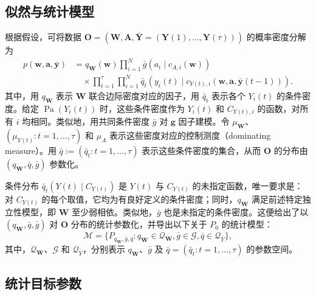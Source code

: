 \subsection{似然与统计模型}

根据假设，可将数据 $\mathbf O=(\mathbf W,\mathbf A,\bar{\mathbf Y}=(\mathbf Y(1),\ldots,\mathbf Y(\tau)))$ 的概率密度分解为
\begin{equation}
\begin{aligned}
 p(\mathbf w,\mathbf a,\bar{\mathbf y})
 &=q_{\mathbf W}(\mathbf w)\prod_{i=1}^N\bar g(a_i\mid c_{A,i}(\mathbf w))\\
 &\quad{}\times\prod_{t=1}^\tau\prod_{i=1}^N
 \bar q_t(y_i(t)\mid c_{Y(t),i}(\mathbf w,\mathbf a,\bar{\mathbf y}(t-1))).
\end{aligned}
\tag{20.7}
\end{equation}
其中，用 $q_{\mathbf W}$ 表示 $\mathbf W$ 联合边际密度对应的因子，用 $\bar q_t$ 表示各个 $Y_i(t)$ 的条件密度。给定 $\operatorname{Pa}(Y_i(t))$ 时，这些条件密度作为 $Y_i(t)$ 和 $C_{Y(t),i}$ 的函数，对所有 $i$ 均相同。类似地，用共同条件密度 $\bar g$ 对 $\mathbf g$ 因子建模。令 $\mu_{\mathbf W}$、$(\mu_{Y(t)}:t=1,\ldots,\tau)$ 和 $\mu_A$ 表示这些密度对应的控制测度（dominating measure）。用 $\bar q:=(\bar q_t:t=1,\ldots,\tau)$ 表示这些条件密度的集合，从而 $\mathbf O$ 的分布由 $(q_{\mathbf W},\bar q,\bar g)$ 参数化。

条件分布 $\bar q_t(Y(t)\mid C_{Y(t)})$ 是 $Y(t)$ 与 $C_{Y(t)}$ 的未指定函数，唯一要求是：对 $C_{Y(t)}$ 的每个取值，它均为有良好定义的条件密度；同时，$q_{\mathbf W}$ 满足前述特定独立性模型，即 $\mathbf W$ 至少弱相依。类似地，$\bar g$ 也是未指定的条件密度。这便给出了以 $(q_{\mathbf W},\bar q,\bar g)$ 对 $\mathbf O$ 分布的统计参数化，并导出以下关于 $P_0$ 的统计模型：
\begin{equation}
 \mathcal M=\{P_{q_{\mathbf W},\bar g,\bar q}:
 q_{\mathbf W}\in\mathcal Q_{\mathbf W},\bar g\in\mathcal G,
 \bar q\in\mathcal Q_{\bar Y}\},
 \tag{20.8}
\end{equation}
其中，$\mathcal Q_{\mathbf W}$、$\mathcal G$ 和 $\mathcal Q_{\bar Y}$，分别表示 $q_{\mathbf W}$、$\bar g$ 及 $\bar q=(\bar q_t:t=1,\ldots,\tau)$ 的参数空间。

\subsection{统计目标参数}


